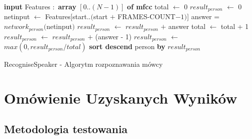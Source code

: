 \documentclass[a4paper]{article}
\begin{document}
		\begin{algorithm}
			\begin{algorithmic}[1]
				\STATE \textbf{input} Features $:$ \textbf{array} $[0 .. (N-1)]$ \textbf{of mfcc}
				\STATE				
				\STATE total $\leftarrow$ 0
					\STATE $result_{person}$ $\leftarrow$ 0
				\ENDFOR
				\STATE
					\STATE {}
					\STATE {}
					\STATE netinput $\leftarrow$ Features$[$start$ .. ($start $+$ FRAMES-COUNT$-1)]$
					\STATE
						\STATE answer = $network_{person}($netinput$)$
								\STATE $result_{person}$ $\leftarrow$ $result_{person}$ $+$ answer
								\STATE total $\leftarrow$ total + 1
							\ELSE
								\STATE $result_{person}$ $\leftarrow$ $result_{person}$ $+$ (answer - 1)
							\ENDIF
							\STATE {}
						\ENDIF	
					\ENDFOR
				\ENDFOR
				\STATE
					\STATE $result_{person}$ $\leftarrow$ $max(0, result_{person} / total)$
				\ENDFOR
				\STATE \textbf{sort descend} person \textbf{by} $result_{person}$
			\end{algorithmic}			
			\caption{RecogniseSpeaker - Algorytm rozpoznawania mówcy}
			\label{alg:recognise}
		\end{algorithm}
		\clearpage
	
\section{Omówienie Uzyskanych Wyników}
	\subsection{Metodologia testowania}
	
\end{document}
